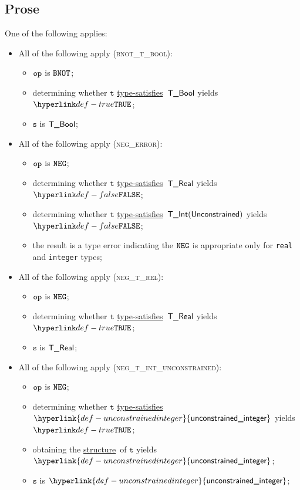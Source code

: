 \documentclass{book}
\newcommand\ProseOrTypeError[0]{\ProseTerminateAs{\TypeErrorConfig}}
\newcommand\unconstrainedinteger[0]{\hyperlink{def-unconstrainedinteger}{\textsf{unconstrained\_integer}}}
\newcommand\structure[0]{\hyperlink{def-structure}{structure}}
\newcommand\typesatisfies[0]{\hyperlink{def-typesatisfies}{type-satisfies}}
\newcommand\vt[0]{\texttt{t}}
\newcommand\vs[0]{\texttt{s}}
\begin{document}
\subsection{Prose}
One of the following applies:
\begin{itemize}
\item All of the following apply (\textsc{bnot\_t\_bool}):
  \begin{itemize}
    \item $\texttt{op}$ is $\texttt{BNOT}$;
    \item determining whether $\vt$ \typesatisfies\ $\textsf{T\_Bool}$ yields $\True$\ProseOrTypeError;
    \item $\vs$ is $\textsf{T\_Bool}$;
  \end{itemize}

\item All of the following apply (\textsc{neg\_error}):
\begin{itemize}
  \item $\texttt{op}$ is $\texttt{NEG}$;
  \item determining whether $\vt$ \typesatisfies\ $\textsf{T\_Real}$ yields $\False$\ProseOrTypeError;
  \item determining whether $\vt$ \typesatisfies\ $\textsf{T\_Int}(\textsf{Unconstrained})$ yields $\False$\ProseOrTypeError;
  \item the result is a type error indicating the $\texttt{NEG}$ is appropriate only for \texttt{real} and \texttt{integer} types;
\end{itemize}

\item All of the following apply (\textsc{neg\_t\_rel}):
\begin{itemize}
  \item $\texttt{op}$ is $\texttt{NEG}$;
  \item determining whether $\vt$ \typesatisfies\ $\textsf{T\_Real}$ yields $\True$\ProseOrTypeError;
  \item $\vs$ is $\textsf{T\_Real}$;
\end{itemize}

\item All of the following apply (\textsc{neg\_t\_int\_unconstrained}):
\begin{itemize}
  \item $\texttt{op}$ is $\texttt{NEG}$;
  \item determining whether $\vt$ \typesatisfies\ $\unconstrainedinteger$ yields $\True$\ProseOrTypeError;
  \item obtaining the \structure\ of $\vt$ yields $\unconstrainedinteger$\ProseOrTypeError;
  \item $\vs$ is $\unconstrainedinteger$;
\end{itemize}


\end{itemize}
\end{document}
